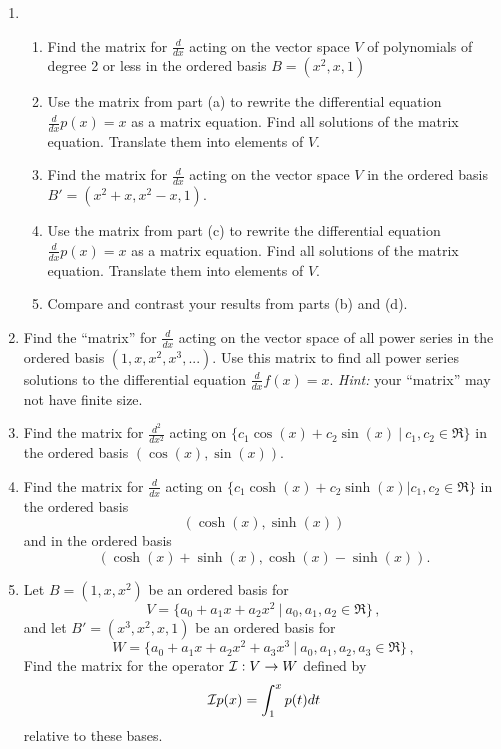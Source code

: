 \begin{enumerate}
\item
\begin{enumerate}
\item
Find the matrix for $\frac{d}{dx}$ acting on the vector space $V$ of polynomials of degree 2 or less in  the ordered basis $B=(x^2,x,1)$\\
\item Use the matrix from part (a) to rewrite the differential equation $\frac{d}{dx} p(x)=x$ as a matrix equation. Find all solutions of the matrix equation. Translate them into elements of $V$.\\\item Find  the matrix for $\frac{d}{dx}$ acting on the vector space $V$  in the ordered basis  $B'=(x^2+x,x^2-x,1)$.\\ 
\item  Use the matrix from part (c) to rewrite the differential equation $\frac{d}{dx} p(x)=x$ as a matrix equation. Find all solutions of the matrix equation. Translate them into elements of $V$.\\
\item Compare and contrast your results from parts (b) and (d).
\end{enumerate}

\item Find the ``matrix'' for $\frac{d}{dx}$ acting on the vector space of all power series in the ordered basis $(1,x,x^2,x^3,...)$. Use this matrix to find all power series solutions to the differential equation $\frac{d}{dx} f(x)=x$. {\itshape Hint:} your ``matrix'' may not have finite size.\\


\item Find the matrix for $\frac{d^2}{dx^2}$ acting on 
$\{ c_1 \cos(x)+c_2 \sin(x)  ~|~c_1,c_2\in \Re\}$ in the ordered basis $(\cos(x),\sin(x))$.\\

\item Find the matrix for $\frac{d}{dx}$ acting on $\{ c_1 \cosh(x)+c_2 \sinh(x) |c_1,c_2\in \Re\}$ in the ordered basis 
\[(\cosh(x),\sinh(x))\] 
and in the ordered basis  \[(\cosh(x)+\sinh(x), \cosh(x)-\sinh(x)).\]

\item Let $B=(1,x,x^2)$ be an ordered basis for
\[V=\{ a_0+a_1x+a_2x^2~|~ a_0,a_1,a_2 \in \Re\}\, ,\] 
and let 
$B'=(x^3,x^2,x,1)$ be an ordered basis for 
\[W=\{ a_0+a_1x+a_2x^2+a_3x^3 ~|~  a_0,a_1,a_2,a_3 \in \Re\}\, ,\]  
Find the matrix for the operator ${\cal I}:V\to W$  defined by \[{\cal I}p(x)=\int_1^x p(t)dt\] relative to these bases.



\end{enumerate}

